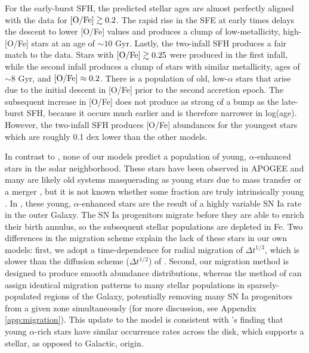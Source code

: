 \documentclass[twocolumn,twocolappendix,linenumbers]{aastex631}
\begin{document}
For the early-burst SFH, the predicted stellar ages are almost perfectly aligned with the data for ${\rm [O/Fe]}\gtrsim 0.2$. The rapid rise in the SFE at early times delays the descent to lower [O/Fe] values and produces a clump of low-metallicity, high-[O/Fe] stars at an age of $\sim10$ Gyr. 
Lastly, the two-infall SFH produces a fair match to the data. Stars with ${\rm [O/Fe]}\gtrsim 0.25$ were produced in the first infall, while the second infall produces a clump of stars with similar metallicity, ages of $\sim8$ Gyr, and ${\rm [O/Fe]}\approx0.2$. There is a population of old, low-$\alpha$ stars that arise due to the initial descent in [O/Fe] prior to the second accretion epoch. The subsequent increase in [O/Fe] does not produce as strong of a bump as the late-burst SFH, because it occurs much earlier and is therefore narrower in log(age). However, the two-infall SFH produces [O/Fe] abundances for the youngest stars which are roughly 0.1 dex lower than the other models.

In contrast to , none of our models predict a population of young, $\alpha$-enhanced stars in the solar neighborhood. These stars have been observed in APOGEE \citep[e.g.,][]{Martig2016-CNAbundances,SilvaAguirre2018-YoungAlphaEnhanced} and many are likely old systems masquerading as young stars due to mass transfer or a merger \citep[e.g.,][]{Yong2016-YoungAlphaRich}, but it is not known whether some fraction are truly intrinsically young \citep{HekkerJohnson2019-YoungAlphaRich}. In , these young, $\alpha$-enhanced stars are the result of a highly variable SN Ia rate in the outer Galaxy. The SN Ia progenitors migrate before they are able to enrich their birth annulus, so the subsequent stellar populations are depleted in Fe. Two differences in the migration scheme explain the lack of these stars in our own models: first, we adopt a time-dependence for radial migration of $\Delta t^{1/3}$, which is slower than the diffusion scheme ($\Delta t^{1/2}$) of . Second, our migration method is designed to produce smooth abundance distributions, whereas the method of  can assign identical migration patterns to many stellar populations in sparsely-populated regions of the Galaxy, potentially removing many SN Ia progenitors from a given zone simultaneously (for more discussion, see Appendix \ref{app:migration}). This update to the model is consistent with \citeauthor{Grisoni2024-YoungAlphaRich}'s \citeyearpar{Grisoni2024-YoungAlphaRich} finding that young $\alpha$-rich stars have similar occurrence rates across the disk, which supports a stellar, as opposed to Galactic, origin.
\end{document}
